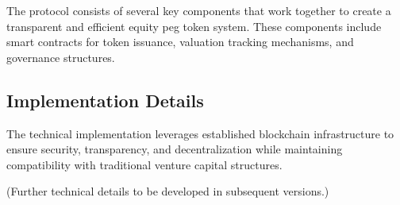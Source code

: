 \documentclass[conference]{IEEEtran}
\begin{document}
The protocol consists of several key components that work together to create a transparent and efficient equity peg token system. These components include smart contracts for token issuance, valuation tracking mechanisms, and governance structures.

\subsection{Implementation Details}

The technical implementation leverages established blockchain infrastructure to ensure security, transparency, and decentralization while maintaining compatibility with traditional venture capital structures.

(Further technical details to be developed in subsequent versions.)



\end{document}
